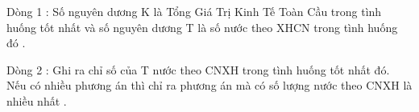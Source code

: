 Dòng 1 : Số nguyên dương K là Tổng Giá Trị Kinh Tế Toàn Cầu trong tình huống tốt nhất và số nguyên dương T là số nước theo XHCN trong tình huống đó .   


   Dòng 2 : Ghi ra chỉ số của T nước theo CNXH trong tình huống tốt nhất đó. Nếu có nhiều phương án thì chỉ ra phương án mà có số lượng nước theo CNXH là nhiều nhất .